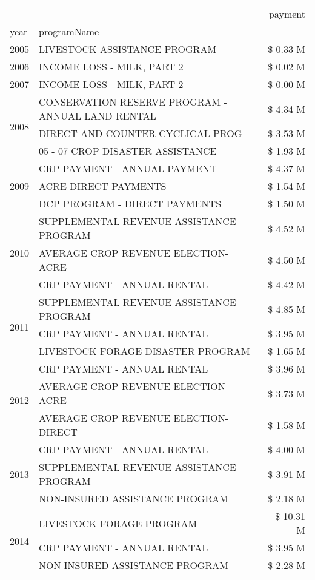 \begin{tabular}{llr}
\toprule
 &  & payment \\
year & programName &  \\
\midrule
2005 & LIVESTOCK ASSISTANCE PROGRAM & \$ 0.33 M \\
\cline{1-3}
2006 & INCOME LOSS - MILK, PART 2 & \$ 0.02 M \\
\cline{1-3}
2007 & INCOME LOSS - MILK, PART 2 & \$ 0.00 M \\
\cline{1-3}
\multirow[t]{3}{*}{2008} & CONSERVATION RESERVE PROGRAM - ANNUAL LAND RENTAL & \$ 4.34 M \\
 & DIRECT AND COUNTER CYCLICAL PROG & \$ 3.53 M \\
 & 05 - 07 CROP DISASTER ASSISTANCE & \$ 1.93 M \\
\cline{1-3}
\multirow[t]{3}{*}{2009} & CRP PAYMENT - ANNUAL PAYMENT & \$ 4.37 M \\
 & ACRE DIRECT PAYMENTS & \$ 1.54 M \\
 & DCP PROGRAM - DIRECT PAYMENTS & \$ 1.50 M \\
\cline{1-3}
\multirow[t]{3}{*}{2010} & SUPPLEMENTAL REVENUE ASSISTANCE PROGRAM & \$ 4.52 M \\
 & AVERAGE CROP REVENUE ELECTION-ACRE & \$ 4.50 M \\
 & CRP PAYMENT - ANNUAL RENTAL & \$ 4.42 M \\
\cline{1-3}
\multirow[t]{3}{*}{2011} & SUPPLEMENTAL REVENUE ASSISTANCE PROGRAM & \$ 4.85 M \\
 & CRP PAYMENT - ANNUAL RENTAL & \$ 3.95 M \\
 & LIVESTOCK FORAGE DISASTER PROGRAM & \$ 1.65 M \\
\cline{1-3}
\multirow[t]{3}{*}{2012} & CRP PAYMENT - ANNUAL RENTAL & \$ 3.96 M \\
 & AVERAGE CROP REVENUE ELECTION-ACRE & \$ 3.73 M \\
 & AVERAGE CROP REVENUE ELECTION-DIRECT & \$ 1.58 M \\
\cline{1-3}
\multirow[t]{3}{*}{2013} & CRP PAYMENT - ANNUAL RENTAL & \$ 4.00 M \\
 & SUPPLEMENTAL REVENUE ASSISTANCE PROGRAM & \$ 3.91 M \\
 & NON-INSURED ASSISTANCE PROGRAM & \$ 2.18 M \\
\cline{1-3}
\multirow[t]{3}{*}{2014} & LIVESTOCK FORAGE PROGRAM & \$ 10.31 M \\
 & CRP PAYMENT - ANNUAL RENTAL & \$ 3.95 M \\
 & NON-INSURED ASSISTANCE PROGRAM & \$ 2.28 M \\

\end{tabular}
